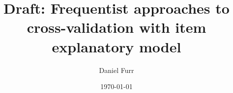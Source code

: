 \documentclass{article}
\begin{document}
\author{Daniel Furr}
\date{\today}

%

\title{Draft: Frequentist approaches to cross-validation with item explanatory model}
\maketitle


%

\printbibliography
\end{document}
